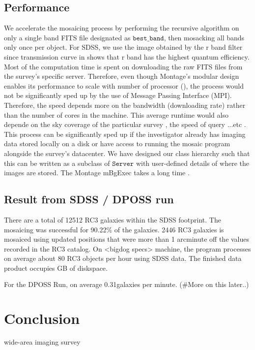 \documentclass[5p]{elsarticle}
\begin{document}
	\subsection{Performance}	
	\indent We accelerate the mosaicing process by performing the recursive algorithm on only a single band FITS file designated as $\texttt{best\_band}$, then mosacking all bands only once per object. For SDSS, we use the image obtained by the r band filter since transmission curve in \citet{edr} shows that r band has the highest quantum efficiency. 
	\\ \indent  Most of the computation time is spent on downloading the raw FITS files from the survey's specific server. Therefore, even though Montage's modular design enables its performance to scale with number of processor  (\citet{montage}), the process would not be significantly sped up by the use of Message Passing Interface (MPI). Therefore, the speed depends more on the bandwidth (downloading rate) rather than the number of cores in the machine. This average runtime would also depende on the sky coverage of the  particular survey , the speed of query ...etc . 
	\\ \indent This process can  be significantly sped up if the investigator already has imaging data stored locally on a disk or have access to running the mosaic program alongside the survey's datacenter. We have designed our class hierarchy such that this can be written as a subclass of $\texttt{Server}$ with user-defined details of where the images are stored.
The Montage 	mBgExec takes a long time . 

\subsection{Result from SDSS / DPOSS run}
There are a total of 12512 RC3 galaxies within the SDSS footprint. The mosaicing was  successful for 90.22\% of the galaxies. 2446 RC3 galaxies is mosaiced using updated positions that were more than 1 arcminute off the values recorded in the RC3 catalog.  On <bigdog specs>  machine, the program processes on average about 80 RC3 objects per hour using SDSS data.  %
The finished data product occupies  GB of diskspace. 

For the DPOSS Run, on average 0.31galaxies per minute. (\#More on this later..)

 \section{Conclusion}
wide-area imaging survey
\end{document}
